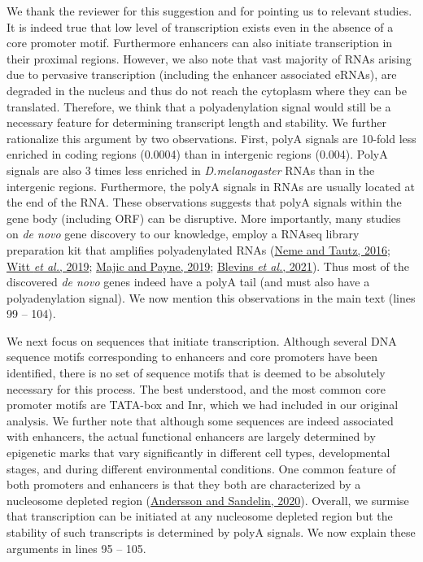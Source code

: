 \documentclass[12pt,a4paper]{article}
\begin{document}
We thank the reviewer for this suggestion and for pointing us to relevant studies. It is indeed true that low level of transcription exists even in the absence of a core promoter motif. Furthermore enhancers can also initiate transcription in their proximal regions. However, we also note that vast majority of RNAs arising due to pervasive transcription (including the enhancer associated eRNAs), are degraded in the nucleus and thus do not reach the cytoplasm where they can be translated. Therefore, we think that a polyadenylation signal would still be a necessary feature for determining transcript length and stability. We further rationalize this argument by two observations. First, polyA signals are 10-fold less enriched in coding regions (0.0004) than in intergenic regions (0.004). PolyA signals are also 3 times less enriched in \textit{D.melanogaster} RNAs than in the intergenic regions. Furthermore, the polyA signals in RNAs are usually located at the end of the RNA. These observations suggests that polyA signals within the gene body (including ORF) can be disruptive. More importantly, many studies on \textit{de novo} gene discovery to our knowledge, employ a RNAseq library preparation kit that amplifies polyadenylated RNAs (\href{https://doi.org/10.7554/eLife.09977}{Neme and Tautz, 2016}; \href{https://doi.org/10.7554/eLife.47138}{Witt \textit{et al.}, 2019}; \href{https://doi.org/10.1093/molbev/msz300}{Majic and Payne, 2019}; \href{https://doi.org/10.1038/s41467-021-20911-3}{Blevins \textit{et al.}, 2021}). Thus most of the discovered \textit{de novo} genes indeed have a polyA tail (and must also have a polyadenylation signal). We now mention this observations in the main text (lines 99 -- 104).

We next focus on sequences that initiate transcription. Although several DNA sequence motifs corresponding to enhancers and core promoters have been identified, there is no set of sequence motifs that is deemed to be absolutely necessary for this process. The best understood, and the most common core promoter motifs are TATA-box and Inr, which we had included in our original analysis. We further note that although some sequences are indeed associated with enhancers, the actual functional enhancers are largely determined by epigenetic marks that vary significantly in different cell types, developmental stages, and during different environmental conditions. One common feature of both promoters and enhancers is that they both are characterized by a nucleosome depleted region (\href{https://doi.org/10.1038/s41576-019-0173-8}{Andersson and Sandelin, 2020}). Overall, we surmise that transcription can be initiated at any nucleosome depleted region but the stability of such transcripts is determined by polyA signals. We now explain these arguments in lines 95 -- 105.
\end{document}
